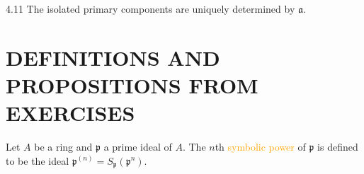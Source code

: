 \begin{corollary}{4.11}
	The isolated primary components are uniquely determined by $\mathfrak{a}$.
\end{corollary}

\section*{DEFINITIONS AND PROPOSITIONS FROM EXERCISES}

\begin{definition}
	Let $A$ be a ring and $\mathfrak{p}$ a prime ideal of $A$. The $n$th \textcolor{orange}{symbolic power} of $\mathfrak{p}$ is defined to be the ideal $\mathfrak{p}^{(n)}=S_\mathfrak{p}\left(\mathfrak{p}^n\right)$.
\end{definition}